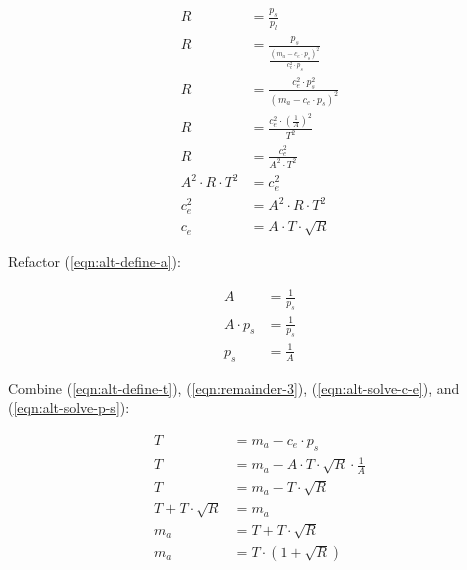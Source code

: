\documentclass[table, twocolumn]{article}
\begin{document}
\begin{align} \label{eqn:alt-solve-c-e}
  R                     & = \frac{p_s}{p_l} \nonumber                           \\
  R                     & =
  \frac{p_s}{\frac{(m_a - c_e \cdot p_s) ^ 2}{c_e ^ 2 \cdot p_s}} \nonumber     \\
  R                     & =
  \frac{c_e ^ 2 \cdot p_s^2}{(m_a - c_e \cdot p_s) ^ 2} \nonumber               \\
  R                     & = \frac{c_e ^ 2 \cdot (\frac{1}{A})^2}{T^2} \nonumber \\
  R                     & = \frac{c_e ^ 2}{A^2 \cdot T^2} \nonumber             \\
  A^2 \cdot R \cdot T^2 & = c_e ^ 2 \nonumber                                   \\
  c_e^2                 & = A^2 \cdot R \cdot T^2 \nonumber                     \\
  c_e                   & = A \cdot T \cdot \sqrt{R}
\end{align}

Refactor (\ref{eqn:alt-define-a}):

\begin{align} \label{eqn:alt-solve-p-s}
  A           & = \frac{1}{p_s} \nonumber \\
  A \cdot p_s & = \frac{1}{p_s} \nonumber \\
  p_s         & = \frac{1}{A}
\end{align}

Combine (\ref{eqn:alt-define-t}), (\ref{eqn:remainder-3}), (\ref{eqn:alt-solve-c-e}),
and (\ref{eqn:alt-solve-p-s}):

\begin{align} \label{eqn:alt-solve-m-a}
  T                    & = m_a - c_e \cdot p_s \nonumber                              \\
  T                    & = m_a - A \cdot T \cdot \sqrt{R} \cdot \frac{1}{A} \nonumber \\
  T                    & = m_a - T \cdot \sqrt{R} \nonumber                           \\
  T + T \cdot \sqrt{R} & = m_a \nonumber                                              \\
  m_a                  & = T + T \cdot \sqrt{R} \nonumber                             \\
  m_a                  & = T \cdot (1 + \sqrt{R})
\end{align}
\end{document}
